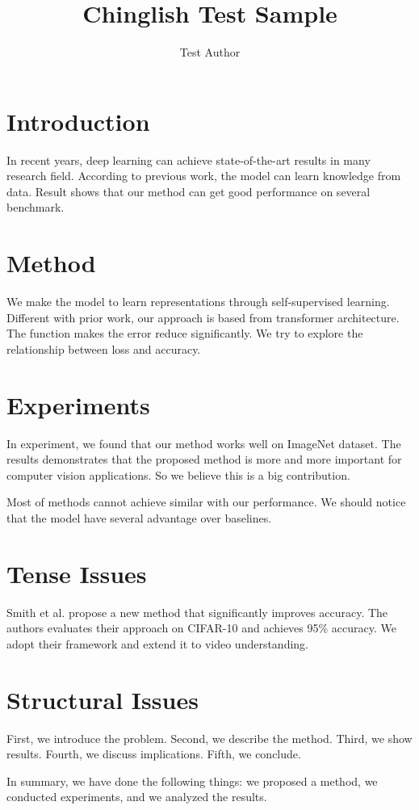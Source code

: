 \documentclass{article}
\title{Chinglish Test Sample}
\author{Test Author}
\begin{document}
\maketitle

\section{Introduction}

In recent years, deep learning can achieve state-of-the-art results in many research field.
According to previous work, the model can learn knowledge from data.
Result shows that our method can get good performance on several benchmark.

\section{Method}

We make the model to learn representations through self-supervised learning.
Different with prior work, our approach is based from transformer architecture.
The function makes the error reduce significantly.
We try to explore the relationship between loss and accuracy.

\section{Experiments}

In experiment, we found that our method works well on ImageNet dataset.
The results demonstrates that the proposed method is more and more important
for computer vision applications. So we believe this is a big contribution.

Most of methods cannot achieve similar with our performance.
We should notice that the model have several advantage over baselines.

\section{Tense Issues}

Smith et al. \cite{smith2023} propose a new method that significantly improves
accuracy. The authors evaluates their approach on CIFAR-10 and achieves 95\% accuracy.
We adopt their framework and extend it to video understanding.

\section{Structural Issues}

First, we introduce the problem. Second, we describe the method. Third, we show results.
Fourth, we discuss implications. Fifth, we conclude.

In summary, we have done the following things: we proposed a method, we conducted experiments,
and we analyzed the results.
\end{document}

